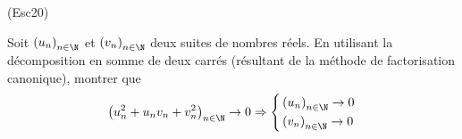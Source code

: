 \begin{tiny}(Esc20)\end{tiny} Soit $\left( u_n\right) _{n\in \N}$ et $\left( v_n\right) _{n\in \N}$ deux suites de nombres réels. En utilisant la décomposition en somme de deux carrés (résultant de la méthode de factorisation canonique), montrer que
\begin{displaymath}
 \left( u^2_n +u_nv_n +v_n^2\right) _{n\in \N}\rightarrow 0
\Rightarrow
\left\lbrace 
\begin{aligned}
 &\left( u_n\right) _{n\in \N} \rightarrow 0 \\
&\left( v_n\right) _{n\in \N} \rightarrow 0 
\end{aligned}
\right. 
\end{displaymath}
